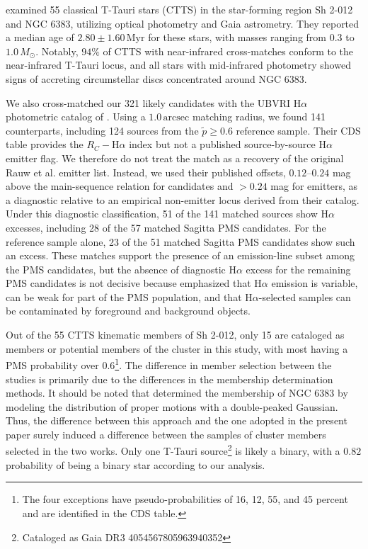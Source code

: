 \documentclass{aa}
\begin{document}
\citet{2019MNRAS.484.5102K} examined 55 classical T-Tauri stars (CTTS) in the star-forming region Sh 2-012 and NGC 6383, utilizing optical photometry and Gaia astrometry. They reported a median age of $2.80 \pm 1.60\,\mathrm{Myr}$ for these stars, with masses ranging from $0.3$ to $1.0\,M_\odot$. Notably, $94\%$ of CTTS with near-infrared cross-matches conform to the near-infrared T-Tauri locus, and all stars with mid-infrared photometry showed signs of accreting circumstellar discs concentrated around NGC 6383.

We also cross-matched our 321 likely candidates with the UBVRI H$\alpha$ photometric catalog of \citet{2010AA...511A..25R}. Using a $1.0\,\mathrm{arcsec}$ matching radius, we found 141 counterparts, including 124 sources from the $\tilde{p}\geq0.6$ reference sample. Their CDS table provides the $R_C-\mathrm{H}\alpha$ index but not a published source-by-source H$\alpha$ emitter flag. We therefore do not treat the match as a recovery of the original Rauw et al. emitter list. Instead, we used their published offsets, $0.12$--$0.24$ mag above the main-sequence relation for candidates and $>0.24$ mag for emitters, as a diagnostic relative to an empirical non-emitter locus derived from their catalog. Under this diagnostic classification, 51 of the 141 matched sources show H$\alpha$ excesses, including 28 of the 57 matched Sagitta PMS candidates. For the reference sample alone, 23 of the 51 matched Sagitta PMS candidates show such an excess. These matches support the presence of an emission-line subset among the PMS candidates, but the absence of diagnostic H$\alpha$ excess for the remaining PMS candidates is not decisive because \citet{2010AA...511A..25R} emphasized that H$\alpha$ emission is variable, can be weak for part of the PMS population, and that H$\alpha$-selected samples can be contaminated by foreground and background objects.

Out of the 55 CTTS kinematic members of Sh 2-012, only 15 are cataloged as members or potential members of the cluster in this study, with most having a PMS probability over $0.6$\footnote{The four exceptions have pseudo-probabilities of 16, 12, 55, and 45 percent and are identified in the CDS table.}. The difference in member selection between the studies is primarily due to the differences in the membership determination methods. It should be noted that \citet{2019MNRAS.484.5102K} determined the membership of NGC 6383 by modeling the distribution of proper motions with a double-peaked Gaussian. Thus, the difference between this approach and the one adopted in the present paper surely induced a difference between the samples of cluster members selected in the two works. Only one T-Tauri source\footnote{Cataloged as Gaia DR3 4054567805963940352} is likely a binary, with a $0.82$ probability of being a binary star according to our analysis.
\end{document}
